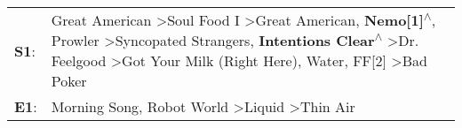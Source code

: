 \begin{supertabular}{p{0.03\textwidth}p{0.92\textwidth}}
 \textbf{S1}:  &  Great American\textsuperscript{} \textgreater \enspace Soul Food I\textsuperscript{} \textgreater \enspace Great American\textsuperscript{}, \enspace \textbf{Nemo[1]\textsuperscript{$\wedge$}}, \enspace Prowler\textsuperscript{} \textgreater \enspace Syncopated Strangers\textsuperscript{}, \enspace \textbf{Intentions Clear\textsuperscript{$\wedge$}} \textgreater \enspace Dr. Feelgood\textsuperscript{} \textgreater \enspace Got Your Milk (Right Here)\textsuperscript{}, \enspace Water\textsuperscript{}, \enspace FF[2]\textsuperscript{} \textgreater \enspace Bad Poker\textsuperscript{}  \enspace  \\
 \textbf{E1}:  &                                                                                                                                                                                                                                                                                                                                                                                                                                         Morning Song\textsuperscript{}, \enspace Robot World\textsuperscript{} \textgreater \enspace Liquid\textsuperscript{} \textgreater \enspace Thin Air\textsuperscript{}  \enspace  \\
\end{supertabular}
